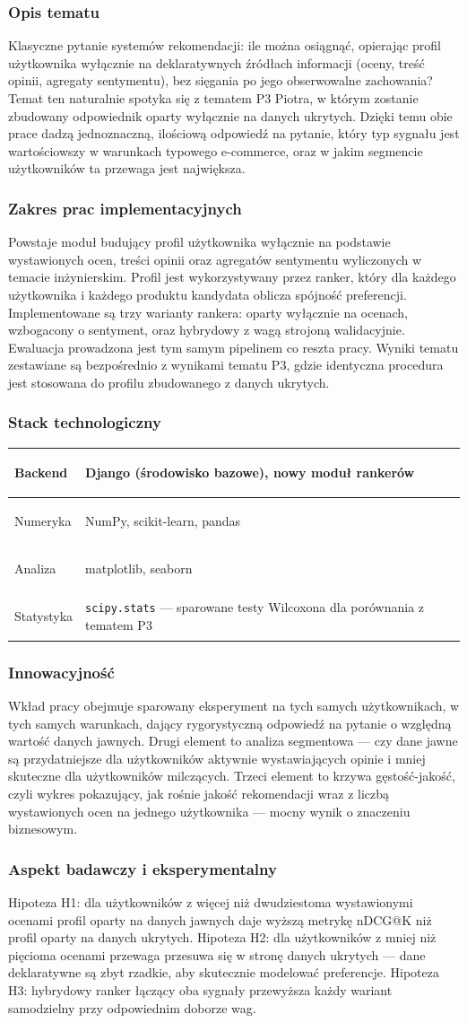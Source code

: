 \documentclass[12pt,a4paper]{article}
\newenvironment{stacktab}{%
    \arrayrulecolor{border}%
    \begin{tabular}{|>{\columncolor{lightbg}\bfseries\color{primary}\raggedright\arraybackslash}p{4.2cm}|>{\raggedright\arraybackslash}p{12cm}|}
    \hline
}{%
    \end{tabular}%
    \arrayrulecolor{black}%
}
\newcommand{\stackrow}[2]{#1 & #2 \\ \hline}
\newcommand{\topicsection}[1]{\subsubsection*{#1}}
\begin{document}
\topicsection{Opis tematu}
Klasyczne pytanie systemów rekomendacji: ile można osiągnąć, opierając profil użytkownika wyłącznie na deklaratywnych źródłach informacji (oceny, treść opinii, agregaty sentymentu), bez sięgania po jego obserwowalne zachowania? Temat ten naturalnie spotyka się z tematem P3 Piotra, w którym zostanie zbudowany odpowiednik oparty wyłącznie na danych ukrytych. Dzięki temu obie prace dadzą jednoznaczną, ilościową odpowiedź na pytanie, który typ sygnału jest wartościowszy w warunkach typowego e-commerce, oraz w jakim segmencie użytkowników ta przewaga jest największa.

\topicsection{Zakres prac implementacyjnych}
Powstaje moduł budujący profil użytkownika wyłącznie na podstawie wystawionych ocen, treści opinii oraz agregatów sentymentu wyliczonych w temacie inżynierskim. Profil jest wykorzystywany przez ranker, który dla każdego użytkownika i każdego produktu kandydata oblicza spójność preferencji. Implementowane są trzy warianty rankera: oparty wyłącznie na ocenach, wzbogacony o sentyment, oraz hybrydowy z wagą strojoną walidacyjnie. Ewaluacja prowadzona jest tym samym pipelinem co reszta pracy. Wyniki tematu zestawiane są bezpośrednio z wynikami tematu P3, gdzie identyczna procedura jest stosowana do profilu zbudowanego z danych ukrytych.

\topicsection{Stack technologiczny}
\begin{stacktab}
\stackrow{Backend}{Django (środowisko bazowe), nowy moduł rankerów}
\stackrow{Numeryka}{NumPy, scikit-learn, pandas}
\stackrow{Analiza}{matplotlib, seaborn}
\stackrow{Statystyka}{\texttt{scipy.stats} --- sparowane testy Wilcoxona dla porównania z tematem P3}
\end{stacktab}

\topicsection{Innowacyjność}
Wkład pracy obejmuje sparowany eksperyment na tych samych użytkownikach, w tych samych warunkach, dający rygorystyczną odpowiedź na pytanie o względną wartość danych jawnych. Drugi element to analiza segmentowa --- czy dane jawne są przydatniejsze dla użytkowników aktywnie wystawiających opinie i mniej skuteczne dla użytkowników milczących. Trzeci element to krzywa gęstość-jakość, czyli wykres pokazujący, jak rośnie jakość rekomendacji wraz z liczbą wystawionych ocen na jednego użytkownika --- mocny wynik o znaczeniu biznesowym.

\topicsection{Aspekt badawczy i eksperymentalny}
Hipoteza H1: dla użytkowników z więcej niż dwudziestoma wystawionymi ocenami profil oparty na danych jawnych daje wyższą metrykę nDCG@K niż profil oparty na danych ukrytych. Hipoteza H2: dla użytkowników z mniej niż pięcioma ocenami przewaga przesuwa się w stronę danych ukrytych --- dane deklaratywne są zbyt rzadkie, aby skutecznie modelować preferencje. Hipoteza H3: hybrydowy ranker łączący oba sygnały przewyższa każdy wariant samodzielny przy odpowiednim doborze wag.
\end{document}
